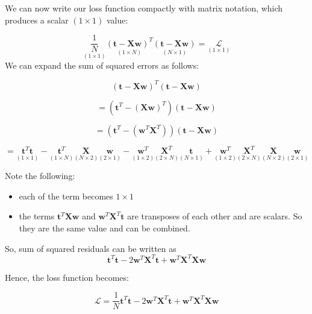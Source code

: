 \documentclass[
]{book}
\begin{document}
We can now write our loss function compactly with matrix notation, which produces a scalar
\((1 \times 1)\) value:

\[
\underset{(1 \times 1)}{\frac{1}{N}}
\underset{(1 \times N)}{(\mathbf{t} - \mathbf{Xw})^T}
\underset{(N \times 1)}{(\mathbf{t} - \mathbf{Xw})}
= 
\underset{(1 \times 1)}{\mathcal{L}}
\]
We can expand the sum of squared errors as follows:

\[
(\mathbf{t} - \mathbf{Xw})^T(\mathbf{t} - \mathbf{Xw})\]

\[= (\mathbf{t}^T - (\mathbf{Xw})^T)(\mathbf{t} - \mathbf{Xw})\]

\[=(\mathbf{t}^T - (\mathbf{w}^T \mathbf{X}^T))(\mathbf{t} - \mathbf{Xw})\]

\begin{equation}
=\underset{(1 \times 1)}{\mathbf{t}^T\mathbf{t}} -
\underset{(1 \times N)}{\mathbf{t}^T}
\underset{(N \times 2)}{\mathbf{X}}
\underset{(2 \times 1)}{\mathbf{w}} -
\underset{(1 \times 2)}{\mathbf{w}^T}
\underset{(2 \times N)}{\mathbf{X}^T}
\underset{(N \times 1)}{\mathbf{t}} +
\underset{(1 \times 2)}{\mathbf{w}^T}
\underset{(2 \times N)}{\mathbf{X}^T}
\underset{(N \times 2)}{\mathbf{X}}
\underset{(2 \times 1)}{\mathbf{w}}
\end{equation}

Note the following:

\begin{itemize}
\item
  each of the term becomes \(1 \times 1\)
\item
  the terms \(\mathbf{t}^T \mathbf{Xw}\) and \(\mathbf{w}^T \mathbf{X}^T\mathbf{t}\) are transposes of each other and are scalars. So they are the same value and can be combined.
\end{itemize}

So, sum of squared residuals can be written as
\[\mathbf{t}^T\mathbf{t} - 2\mathbf{w}^T\mathbf{X}^T\mathbf{t} +
\mathbf{w}^T\mathbf{X}^T\mathbf{X}\mathbf{w}\]

Hence, the loss function becomes:

\[\mathcal{L} = \frac{1}{N}\mathbf{t}^T\mathbf{t} - 2\mathbf{w}^T\mathbf{X}^T\mathbf{t} +
\mathbf{w}^T\mathbf{X}^T\mathbf{X}\mathbf{w}\]

  
\end{document}
